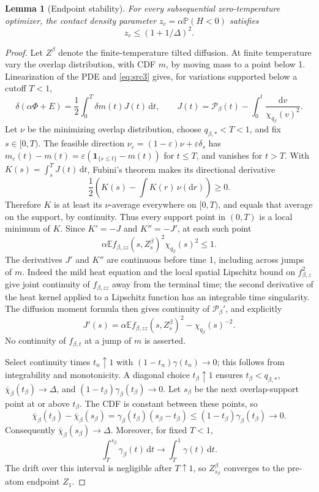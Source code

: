 \documentclass[11pt,a4paper]{article}
\numberwithin{equation}{section}
\newtheorem{lemma}[theorem]{Lemma}
\theoremstyle{definition}
\theoremstyle{remark}
\newcommand{\E}{\mathbb E}
\newcommand{\Prob}{\mathbb P}
\newcommand{\dd}{\mathrm d}
\newcommand{\ind}{\mathbf 1}
\newcommand{\eps}{\varepsilon}
\providecommand{\mathscr}[1]{\mathcal{#1}}
\begin{document}
\begin{lemma}[Endpoint stability]\label{zero:stability}
For every subsequential zero-temperature optimizer, the contact
density parameter \(z_c=\alpha\Prob(H<0)\) satisfies
\begin{equation}
 z_c\le(1+1/\Delta)^2.
 \label{eq:src17}
\end{equation}
\end{lemma}

\begin{proof}
Let \(Z^\beta\) denote the finite-temperature tilted diffusion.
At finite temperature vary the overlap distribution, with CDF \(m\),
by moving mass to a point below 1.  Linearization of the PDE and
\eqref{eq:src3} gives, for variations supported below a cutoff \(T<1\),
\[
 \delta(\alpha\Phi+E)=\frac12\int_0^T\delta m(t)J(t)\,\dd t,
 \qquad
 J(t)=\mathscr P_\beta(t)-\int_0^t\frac{\dd v}{\chi_{q_\beta}(v)^2}.
\]
Let \(\nu\) be the minimizing overlap distribution, choose
\(q_{\beta,*}<T<1\), and fix \(s\in[0,T)\).
The feasible direction
\(\nu_\eps=(1-\eps)\nu+\eps\delta_s\) has
\(m_\eps(t)-m(t)=\eps(\ind_{\{s\le t\}}-m(t))\) for \(t\le T\),
and vanishes for \(t>T\).  With \(K(s)=\int_s^T J(t)\,\dd t\),
Fubini's theorem makes its directional derivative
\[
 \frac12\left(K(s)-\int K(r)\,\nu(\dd r)\right)\ge0.
\]
Therefore \(K\) is at least its \(\nu\)-average everywhere on
\([0,T)\), and equals that average on the support, by continuity.
Thus every support point in \((0,T)\) is a local minimum of \(K\).
Since \(K'=-J\) and \(K''=-J'\), at each such point
\[
 \alpha\E f_{\beta,zz}(s,Z^\beta_s)^2\chi_{q_\beta}(s)^2\le1.
\]
The derivatives \(J'\) and \(K''\) are continuous before time 1,
including across jumps of \(m\).  Indeed the mild heat equation and
the local spatial Lipschitz bound on \(f_{\beta,z}^2\) give joint
continuity of \(f_{\beta,zz}\) away from the terminal time; the
second derivative of the heat kernel applied to a Lipschitz function
has an integrable time singularity.  The diffusion moment formula
then gives continuity of \(\mathscr P_\beta'\), and explicitly
\[
 J'(s)=\alpha\E f_{\beta,zz}(s,Z_s^\beta)^2
                   -\chi_{q_\beta}(s)^{-2}.
\]  No continuity of
\(f_{\beta,t}\) at a jump of \(m\) is asserted.

Select continuity times \(t_n\uparrow1\) with
\((1-t_n)\gamma(t_n)\to0\); this follows from integrability and
monotonicity.  A diagonal choice \(t_\beta\uparrow1\) ensures
\(t_\beta<q_{\beta,*}\),
\(\bar\chi_\beta(t_\beta)\to\Delta\), and
\((1-t_\beta)\gamma_\beta(t_\beta)\to0\).
Let \(s_\beta\) be the next overlap-support point at or above
\(t_\beta\).  The CDF is constant between these points, so
\[
 \bar\chi_\beta(t_\beta)-\bar\chi_\beta(s_\beta)
 =\gamma_\beta(t_\beta)(s_\beta-t_\beta)
 \le(1-t_\beta)\gamma_\beta(t_\beta)\longrightarrow0.
\]
Consequently \(\bar\chi_\beta(s_\beta)\to\Delta\).
Moreover, for fixed \(T<1\),
\[
 \int_T^{s_\beta}\gamma_\beta(t)\,\dd t
 \longrightarrow\int_T^1\gamma(t)\,\dd t.
\]
The drift over this interval is negligible after \(T\uparrow1\),
so \(Z^\beta_{s_\beta}\) converges to the pre-atom endpoint \(Z_1\).


\end{proof}
\end{document}
